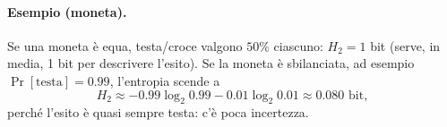 \paragraph{Esempio (moneta).}
Se una moneta è equa, testa/croce valgono \(50\%\) ciascuno: \(H_2=1\) bit (serve, in media, 1 bit per descrivere l'esito).
Se la moneta è sbilanciata, ad esempio \(\Pr[\text{testa}]=0.99\), l'entropia scende a
\[
H_2 \approx -0.99\log_2 0.99 - 0.01\log_2 0.01 \approx 0.080\text{ bit},
\]
perché l'esito è quasi sempre testa: c'è poca incertezza.